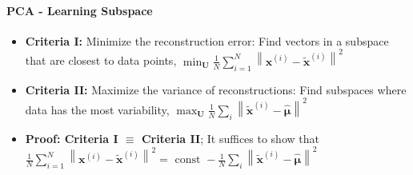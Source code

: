 \documentclass[10pt]{article}
\begin{document}
\paragraph{PCA - Learning Subspace}
\begin{itemize}
	\setlength\itemsep{-0.45em}
	\item \textbf{Criteria I:} Minimize the reconstruction error: Find vectors in a subspace that are closest to data points, $\min _{\mathbf{U}} \frac{1}{N} \sum_{i=1}^{N}\left\|\mathbf{x}^{(i)}-\tilde{\mathbf{x}}^{(i)}\right\|^{2}$
	\item \textbf{Criteria II:} Maximize the variance of reconstructions: Find subspaces where data has the most variability, $\max _{\mathbf{U}} \frac{1}{N} \sum_{i}\left\|\tilde{\mathbf{x}}^{(i)}-\hat{\boldsymbol{\mu}}\right\|^{2}$
	\item \textbf{Proof: Criteria I $\equiv$ Criteria II}; It suffices to show that $\frac{1}{N} \sum_{i=1}^{N}\left\|\mathbf{x}^{(i)}-\tilde{\mathbf{x}}^{(i)}\right\|^{2}=\text { const }-\frac{1}{N} \sum_{i}\left\|\tilde{\mathbf{x}}^{(i)}-\hat{\boldsymbol{\mu}}\right\|^{2}$
\end{itemize}
\newpage
\end{document}
